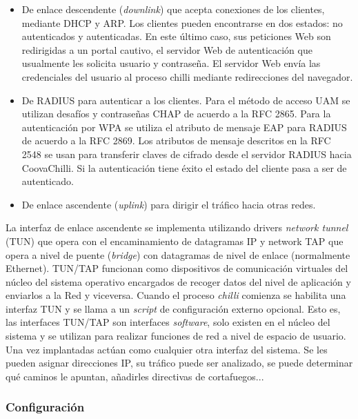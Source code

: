 \begin{itemize}
\item De enlace descendente (\emph{downlink}) que acepta conexiones de los clientes, mediante DHCP y ARP. Los clientes pueden encontrarse en dos estados: no autenticados y autenticadas. En este último caso, sus peticiones Web son redirigidas a un portal cautivo, el servidor Web de autenticación que usualmente les solicita usuario y contraseña. El servidor Web envía las credenciales del usuario al proceso chilli mediante redirecciones del navegador.  
\item De RADIUS para autenticar a los clientes. Para el método de acceso UAM se utilizan desafíos y contraseñas CHAP de acuerdo a la RFC 2865. Para la autenticación por WPA se utiliza el atributo de mensaje EAP para RADIUS de acuerdo a la RFC 2869. Los atributos de mensaje descritos en la RFC 2548 se usan para transferir claves de cifrado desde el servidor RADIUS hacia CoovaChilli. Si la autenticación tiene éxito el estado del cliente pasa a ser de autenticado. 
\item De enlace ascendente (\emph{uplink}) para dirigir el tráfico hacia otras redes. 
\end{itemize}

La interfaz de enlace ascendente se implementa utilizando drivers \emph{network tunnel} (\acrshort{TUN}) que opera con el encaminamiento de datagramas IP y network \acrshort{TAP} que opera a nivel de puente (\emph{bridge}) con datagramas de nivel de enlace (normalmente Ethernet). TUN/TAP funcionan como dispositivos de comunicación virtuales del núcleo del sistema operativo encargados de recoger datos del nivel de aplicación y enviarlos a la Red y viceversa. Cuando el proceso \emph{chilli} comienza se habilita una interfaz TUN y se llama a un \emph{script} de configuración externo opcional. Esto es, las interfaces TUN/TAP son interfaces \emph{software}, solo existen en el núcleo del sistema y se utilizan para realizar funciones de red a nivel de espacio de usuario. Una vez implantadas actúan como cualquier otra interfaz del sistema. Se les pueden asignar direcciones IP, su tráfico puede ser analizado, se puede determinar qué caminos le apuntan, añadirles directivas de cortafuegos...

\subsubsection{Configuración}

